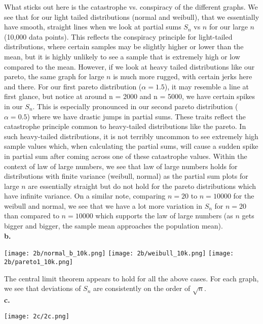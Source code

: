 \documentclass[12 pt]{article}
\begin{document}
	\noindent What sticks out here is the catastrophe vs. conspiracy of the different graphs. We see that for our light tailed distributions (normal and weibull), that we essentially have smooth, straight lines when we look at partial sums $S_n$ vs $n$ for our large $n$ (10,000 data points). This reflects the conspiracy principle for light-tailed distributions, where certain samples may be slightly higher or lower than the mean, but it is highly unlikely to see a sample that is extremely high or low compared to the mean. However, if we look at  heavy tailed distributions like our pareto, the same graph for large $n$ is much more rugged, with certain jerks here and there. For our first pareto distribution ($\alpha = 1.5$), it may resemble a line at first glance, but notice at around n = 2000 and n = 5000, we have certain spikes in our $S_n$. This is especially pronounced in our second pareto distribution ($\alpha = 0.5$) where we have drastic jumps in partial sums. These traits reflect the catastrophe principle common to heavy-tailed distributions like the pareto. In such heavy-tailed distributions, it is not terribly uncommon to see extremely high sample values which, when calculating the partial sums, will cause a sudden spike in partial sum after coming across one of these catastrophe values. Within the context of law of large numbers, we see that law of large numbers holds for distributions with finite variance (weibull, normal) as the partial sum plots for large $n$ are essentially straight but do not hold for the pareto distributions which have infinite variance. On a similar note, comparing $n = 20$ to $n = 10000$ for the weibull and normal, we see that we have a lot more variation in $S_n$ for $n = 20$ than compared to $n = 10000$ which supports the law of large numbers (as $n$ gets bigger and bigger, the sample mean approaches the population mean).  \\
	
	\noindent \textbf {b.}
	\begin{center}
		\texttt{[image: 2b/normal\_b\_10k.png]}
		\texttt{[image: 2b/weibull\_10k.png]}
		\texttt{[image: 2b/pareto1\_10k.png]}
	\end{center}

	\noindent The central limit theorem appears to hold for all the above cases. For each graph, we see that deviations of $S_n$ are consistently on the order of $\sqrt{n}$. \\
	
	\noindent \textbf {c.} 
	
	\begin{center}
		\texttt{[image: 2c/2c.png]}
	\end{center}
	
\end{document}
